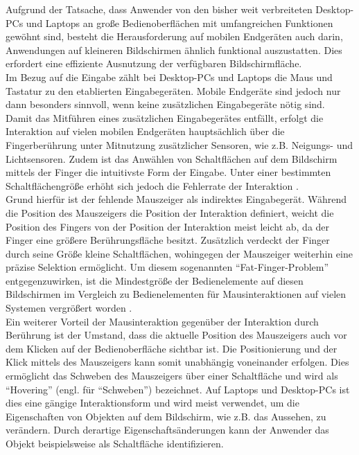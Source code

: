 \documentclass[12pt,numbers=noenddot,parskip,bibliography=totocnumbered,listof=totocnumbered]{scrreprt}
\begin{document}
Aufgrund der Tatsache, dass Anwender von den bisher weit verbreiteten Desktop-PCs und Laptops an große Bedienoberflächen mit umfangreichen Funktionen gewöhnt sind, besteht die Herausforderung auf mobilen Endgeräten auch darin, Anwendungen auf kleineren Bildschirmen ähnlich funktional auszustatten. Dies erfordert eine effiziente Ausnutzung der verfügbaren Bildschirmfläche.\\
Im Bezug auf die Eingabe zählt bei Desktop-PCs und Laptops die Maus und Tastatur zu den etablierten Eingabegeräten. Mobile Endgeräte sind jedoch nur dann besonders sinnvoll, wenn keine zusätzlichen Eingabegeräte nötig sind. Damit das Mitführen eines zusätzlichen Eingabegerätes entfällt, erfolgt die Interaktion auf vielen mobilen Endgeräten hauptsächlich über die Fingerberührung unter Mitnutzung zusätzlicher Sensoren, wie z.B. Neigungs- und Lichtsensoren. Zudem ist das Anwählen von Schaltflächen auf dem Bildschirm mittels der Finger die intuitivste Form der Eingabe. Unter einer bestimmten Schaltflächengröße erhöht sich jedoch die Fehlerrate der Interaktion \citep{mousetouchmk}.\\
Grund hierfür ist der fehlende Mauszeiger als indirektes Eingabegerät. Während die Position des Mauszeigers die Position der Interaktion definiert, weicht die Position des Fingers von der Position der Interaktion meist leicht ab, da der Finger eine größere Berührungsfläche besitzt. Zusätzlich verdeckt der Finger durch seine Größe kleine Schaltflächen, wohingegen der Mauszeiger weiterhin eine präzise Selektion ermöglicht. Um diesem sogenannten "`Fat-Finger-Problem"' \citep{monkeys} entgegenzuwirken, ist die Mindestgröße der Bedienelemente auf diesen Bildschirmen im Vergleich zu Bedienelementen für Mausinteraktionen auf vielen Systemen vergrößert worden \citep{jin}.\\
Ein weiterer Vorteil der Mausinteraktion gegenüber der Interaktion durch Berührung ist der Umstand, dass die aktuelle Position des Mauszeigers auch vor dem Klicken auf der Bedienoberfläche sichtbar ist. Die Positionierung und der Klick mittels des Mauszeigers kann somit unabhängig voneinander erfolgen. Dies ermöglicht das Schweben des Mauszeigers über einer Schaltfläche und wird als "`Hovering"' (engl. für "`Schweben"') bezeichnet. Auf Laptops und Desktop-PCs ist dies eine gängige Interaktionsform und wird meist verwendet, um die Eigenschaften von Objekten auf dem Bildschirm, wie z.B. das Aussehen, zu verändern. Durch derartige Eigenschaftsänderungen kann der Anwender das Objekt beispielsweise als Schaltfläche identifizieren.
\end{document}
